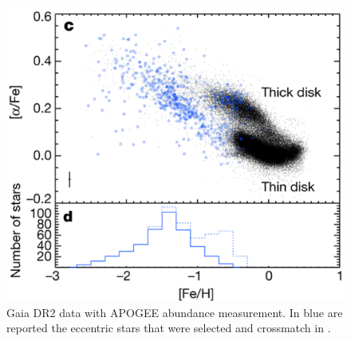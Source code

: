 \begin{figure}[ht]
    \centering
    \includegraphics[width=1\textwidth]{./figure/Gaia_Helmi18.png}
    \caption{Gaia DR2 data with APOGEE abundance measurement. In blue are reported the eccentric stars that were selected and crossmatch in \cite{helmiMergerThatLed2018}.}
    \label{fig:sbi_approaches}
\end{figure}



